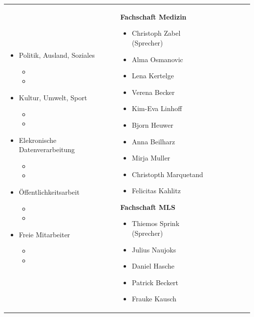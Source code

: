 \documentclass[landscape,a0b,final]{a0poster}
\begin{document}
\begin{tabular}{|p{15cm}||p{15cm}||p{15cm}||p{15cm}||p{15cm}|||p{15cm}||p{15cm}|}
\begin{itemize}
\item Politik, Ausland, Soziales
\begin{itemize}
\item
\item
\end{itemize}
\item Kultur, Umwelt, Sport
\begin{itemize}
\item
\item
\end{itemize}
\item Elekronische Datenverarbeitung
\begin{itemize}
\item
\item
\end{itemize}
\item Öffentlichkeitsarbeit
\begin{itemize}
\item
\item
\end{itemize}
\item Freie Mitarbeiter
\begin{itemize}
\item
\item
\end{itemize}
\end{itemize}
&
\textbf{Fachschaft Medizin}
\begin{itemize}
\item Christoph Zabel (Sprecher)
\item Alma Osmanovic
\item Lena Kertelge
\item Verena Becker
\item Kim-Eva Linhoff
\item Bjorn Heuwer
\item Anna Beilharz
\item Mirja Muller
\item Christopth Marquetand
\item Felicitas Kahlitz
\end{itemize}
\textbf{Fachschaft MLS}
\begin{itemize}
\item Thiemos Sprink (Sprecher)
\item Julius Naujoks
\item Daniel Hasche
\item Patrick Beckert
\item Frauke Kausch
\end{itemize}

\end{tabular}
\end{document}
